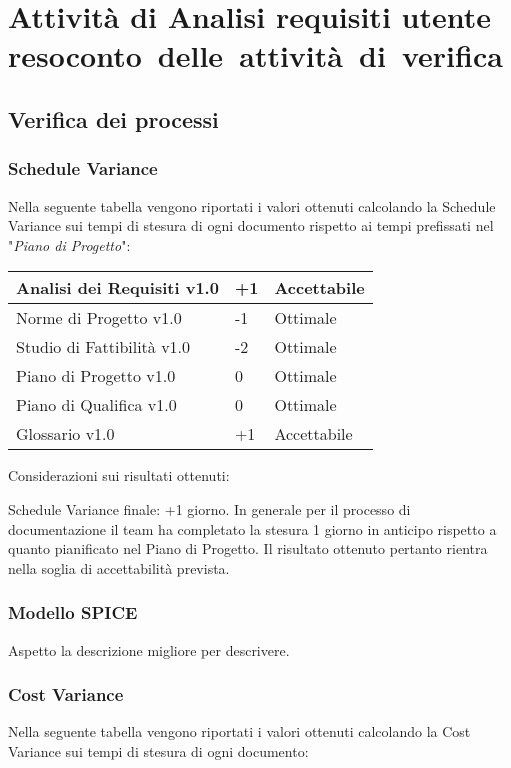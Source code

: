 \newpage
\section{Attività di Analisi requisiti utente \\\large{resoconto~delle~attività~di~verifica}}
\subsection{Verifica dei processi}
\subsubsection{Schedule Variance}
Nella seguente tabella vengono riportati i valori ottenuti calcolando la Schedule Variance sui tempi di stesura di ogni documento rispetto ai tempi prefissati nel "\textit{Piano di Progetto}":

{
	\renewcommand{\arraystretch}{2}
	\centering
	\begin{tabular}{| L{4cm} | R{0.5cm} | C{3cm} |}
	\hline
	Analisi dei Requisiti v1.0 & +1 & Accettabile \\
	\hline
	Norme di Progetto v1.0 & -1 & Ottimale \\
	\hline
	Studio di Fattibilità v1.0 &  -2 &  Ottimale \\
	\hline
	Piano di Progetto v1.0 &  0 &  Ottimale\\
	\hline
	Piano di Qualifica v1.0 & 0 & Ottimale \\
	\hline
	Glossario v1.0 & +1 & Accettabile\\	
	\hline
	\end{tabular}
	
}

Considerazioni sui risultati ottenuti:

Schedule Variance finale: +1 giorno.
In generale per il processo di documentazione il team ha completato la stesura 1 giorno in anticipo rispetto a quanto pianificato nel Piano di Progetto. Il risultato ottenuto pertanto rientra nella soglia di accettabilità prevista.

\subsubsection{Modello SPICE}
Aspetto la descrizione migliore per descrivere.

\subsubsection{Cost Variance}
Nella seguente tabella vengono riportati i valori ottenuti calcolando la Cost Variance sui tempi di stesura di ogni documento:


